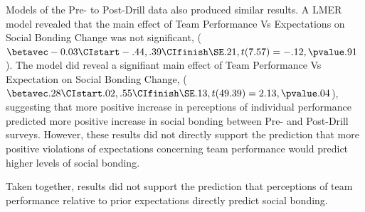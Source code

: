 \begin{CJK}{UTF8}{gbsn}
Models of the Pre- to Post-Drill data also produced similar results.  A LMER model revealed that the main effect of Team Performance Vs Expectations on Social Bonding Change was not significant, ($\betavec -0.03 \CIstart -.44, .39 \CIfinish \SE .21, t(7.57) = -.12, \pvalue .91$). The model did reveal a signifiant main effect of Team Performance Vs Expectation on Social Bonding Change, ($\betavec .28 \CIstart .02, .55 \CIfinish \SE .13, t(49.39) = 2.13, \pvalue .04$), suggesting that more positive increase in perceptions of individual performance predicted more positive increase in social bonding between Pre- and Post-Drill surveys.  However, these results did not directly support the prediction that more positive violations of expectations concerning team performance would predict higher levels of social bonding.

Taken together, results did not support the prediction that perceptions of team performance relative to prior expectations directly predict social bonding.







\end{CJK}
